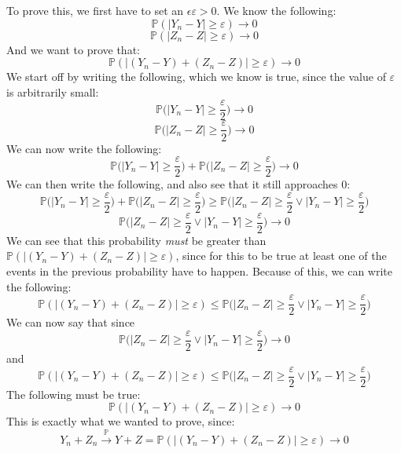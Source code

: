 To prove this, we first have to set an $\epsilon \varepsilon > 0$. We know the following:
$$
\mathbb{P}(|Y_n-Y| \geq \varepsilon) \longrightarrow 0
$$
$$
\mathbb{P}(|Z_n-Z| \geq \varepsilon) \longrightarrow 0
$$
And we want to prove that:
$$
\mathbb{P}(|(Y_n-Y) + (Z_n-Z)| \geq \varepsilon) \longrightarrow 0
$$
We start off by writing the following, which we know is true, since the value of $\varepsilon$ is arbitrarily small:
$$
\mathbb{P}\Big(|Y_n-Y| \geq \frac{\varepsilon}{2}\Big) \longrightarrow 0
$$
$$
\mathbb{P}\Big(|Z_n-Z| \geq \frac{\varepsilon}{2}\Big) \longrightarrow 0
$$
We can now write the following:
$$
\mathbb{P}\Big(|Y_n-Y| \geq \frac{\varepsilon}{2}\Big) + \mathbb{P}\Big(|Z_n-Z| \geq \frac{\varepsilon}{2}\Big) \longrightarrow 0
$$
We can then write the following, and also see that it still approaches 0:
$$
\mathbb{P}\Big(|Y_n-Y| \geq \frac{\varepsilon}{2}\Big) + \mathbb{P}\Big(|Z_n-Z| \geq \frac{\varepsilon}{2}\Big) \geq \mathbb{P}\Big(|Z_n-Z| \geq \frac{\varepsilon}{2} \lor |Y_n-Y| \geq \frac{\varepsilon}{2} \Big)
$$
$$
\mathbb{P}\Big(|Z_n-Z| \geq \frac{\varepsilon}{2} \lor |Y_n-Y| \geq \frac{\varepsilon}{2} \Big) \longrightarrow 0
$$
We can see that this probability \textit{must} be greater than $\mathbb{P}(|(Y_n-Y) + (Z_n-Z)| \geq \varepsilon)$, since for this to be true at least one of the events in the previous probability have to happen. Because of this, we can write the following:
$$
\mathbb{P}(|(Y_n-Y) + (Z_n-Z)| \geq \varepsilon) \leq \mathbb{P}\Big(|Z_n-Z| \geq \frac{\varepsilon}{2} \lor |Y_n-Y| \geq \frac{\varepsilon}{2} \Big)
$$
We can now say that since
$$
\mathbb{P}\Big(|Z_n-Z| \geq \frac{\varepsilon}{2} \lor |Y_n-Y| \geq \frac{\varepsilon}{2} \Big) \longrightarrow 0
$$
and
$$
\mathbb{P}(|(Y_n-Y) + (Z_n-Z)| \geq \varepsilon) \leq \mathbb{P}\Big(|Z_n-Z| \geq \frac{\varepsilon}{2} \lor |Y_n-Y| \geq \frac{\varepsilon}{2} \Big)
$$
The following must be true:
$$
\mathbb{P}(|(Y_n-Y) + (Z_n-Z)| \geq \varepsilon) \longrightarrow 0
$$
This is exactly what we wanted to prove, since:
$$
Y_n+Z_n \overset{\mathbb{P}}{\longrightarrow} Y + Z = \mathbb{P}(|(Y_n-Y) + (Z_n-Z)| \geq \varepsilon) \longrightarrow 0
$$